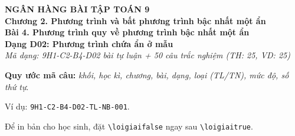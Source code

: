 \documentclass[12pt,a4paper]{article}
\newif\ifloigiai
\begin{document}
\begin{center}
{\Large\textbf{NGÂN HÀNG BÀI TẬP TOÁN 9}}\\[3pt]
\textbf{Chương 2. Phương trình và bất phương trình bậc nhất một ẩn}\\[2pt]
\textbf{Bài 4. Phương trình quy về phương trình bậc nhất một ẩn}\\[2pt]
\textbf{Dạng D02: Phương trình chứa ẩn ở mẫu}\\[2pt]
\textit{Mã dạng: 9H1-C2-B4-D02  bài tự luận + 50 câu trắc nghiệm \quad (TH: 25, VD: 25)}
\end{center}
\textbf{Quy ước mã câu:} \textit{khối, học kì, chương, bài, dạng, loại (TL/TN), mức độ, số thứ tự}.\par Ví dụ: \texttt{9H1-C2-B4-D02-TL-NB-001}.\par Để in bản cho học sinh, đặt \verb|\loigiaifalse| ngay sau \verb|\loigiaitrue|.
\end{document}
